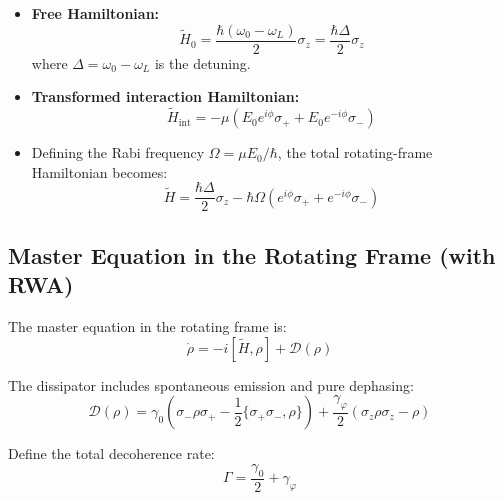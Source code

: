 \begin{itemize}
	\item \textbf{Free Hamiltonian:}
	      \begin{equation}
		      \tilde{H}_0 = \frac{\hbar(\omega_0 - \omega_L)}{2} \sigma_z = \frac{\hbar\Delta}{2} \sigma_z
		      \label{eq:TransformedFreeHamiltonian}
	      \end{equation}
	      where \(\Delta = \omega_0 - \omega_L\) is the detuning.

	\item \textbf{Transformed interaction Hamiltonian:}
	      \begin{equation}
		      \tilde{H}_{\text{int}} = -\mu \left( E_0 e^{i\phi} \sigma_+ + E_0 e^{-i\phi} \sigma_- \right)
		      \label{eq:TransformedInteractionHamiltonian}
	      \end{equation}

	\item Defining the Rabi frequency \(\Omega = \mu E_0 / \hbar\), the total rotating-frame Hamiltonian becomes:
	      \begin{equation}
		      \boxed{
			      \tilde{H} = \frac{\hbar\Delta}{2} \sigma_z - \hbar \Omega \left( e^{i\phi} \sigma_+ + e^{-i\phi} \sigma_- \right)
		      }
		      \label{eq:RotatingFrameHamiltonian}
	      \end{equation}
\end{itemize}

\subsection{Master Equation in the Rotating Frame (with RWA)}

The master equation in the rotating frame is:
\begin{equation}
	\dot{\rho} = -i[\tilde{H}, \rho] + \mathcal{D}(\rho)
	\label{eq:MasterEquationRotatingFrame}
\end{equation}

The dissipator includes spontaneous emission and pure dephasing:
\begin{equation}
	\mathcal{D}(\rho) =
	\gamma_0 \left( \sigma_- \rho \sigma_+ - \frac{1}{2} \{ \sigma_+ \sigma_-, \rho \} \right)
	+ \frac{\gamma_\varphi}{2} \left( \sigma_z \rho \sigma_z - \rho \right)
	\label{eq:DissipatorOperator}
\end{equation}

Define the total decoherence rate:
\begin{equation}
	\Gamma = \frac{\gamma_0}{2} + \gamma_\varphi
	\label{eq:TotalDecoherenceRate}
\end{equation}

